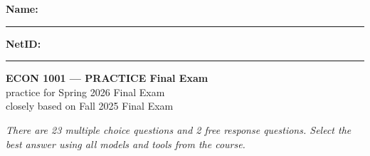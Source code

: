 \documentclass[12pt]{article}
\begin{document}
\vspace*{-1em}
\noindent\textbf{Name:} \rule{3.5in}{0.4pt}
\hfill
\textbf{NetID:} \rule{1.8in}{0.4pt}

\vspace{1.5em}

\begin{center}
  {\Large\textbf{ECON 1001 — PRACTICE Final Exam}}\\[0.5em]
  {\large practice for Spring 2026 Final Exam} \\[0.5em]
  {\small closely based on Fall 2025 Final Exam}
\end{center}

\vspace{1em}

\noindent \emph{There are 23 multiple choice questions and 2 free response questions.
  Select the best answer using all models and tools from the course.}

\vspace{.5em}

\end{document}
